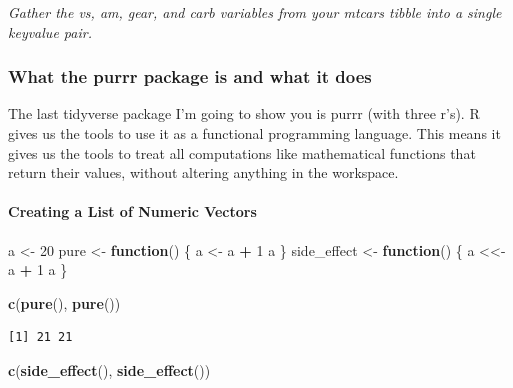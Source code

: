 \documentclass[
]{article}
\newenvironment{Shaded}{\begin{snugshade}}{\end{snugshade}}
\newcommand{\ControlFlowTok}[1]{\textcolor[rgb]{0.13,0.29,0.53}{\textbf{#1}}}
\newcommand{\DecValTok}[1]{\textcolor[rgb]{0.00,0.00,0.81}{#1}}
\newcommand{\FunctionTok}[1]{\textcolor[rgb]{0.13,0.29,0.53}{\textbf{#1}}}
\newcommand{\NormalTok}[1]{#1}
\newcommand{\OtherTok}[1]{\textcolor[rgb]{0.56,0.35,0.01}{#1}}
\newcommand{\SpecialCharTok}[1]{\textcolor[rgb]{0.81,0.36,0.00}{\textbf{#1}}}
\begin{document}
\emph{Gather the vs, am, gear, and carb variables from your mtcars
tibble into a single keyvalue pair.}

\subsubsection{What the purrr package is and what it
does}\label{what-the-purrr-package-is-and-what-it-does}

The last tidyverse package I'm going to show you is purrr (with three
r's). R gives us the tools to use it as a functional programming
language. This means it gives us the tools to treat all computations
like mathematical functions that return their values, without altering
anything in the workspace.

\paragraph{Creating a List of Numeric
Vectors}\label{creating-a-list-of-numeric-vectors}

\begin{Shaded}
\begin{Highlighting}[]
\NormalTok{a }\OtherTok{\textless{}{-}} \DecValTok{20}
\NormalTok{pure }\OtherTok{\textless{}{-}} \ControlFlowTok{function}\NormalTok{() \{}
\NormalTok{  a }\OtherTok{\textless{}{-}}\NormalTok{ a }\SpecialCharTok{+} \DecValTok{1}
\NormalTok{a}
\NormalTok{\}}
\NormalTok{side\_effect }\OtherTok{\textless{}{-}} \ControlFlowTok{function}\NormalTok{() \{}
\NormalTok{  a }\OtherTok{\textless{}\textless{}{-}}\NormalTok{ a }\SpecialCharTok{+} \DecValTok{1}
\NormalTok{a}
\NormalTok{\}}
\end{Highlighting}
\end{Shaded}

\begin{Shaded}
\begin{Highlighting}[]
\FunctionTok{c}\NormalTok{(}\FunctionTok{pure}\NormalTok{(), }\FunctionTok{pure}\NormalTok{())}
\end{Highlighting}
\end{Shaded}

\begin{verbatim}
[1] 21 21
\end{verbatim}

\begin{Shaded}
\begin{Highlighting}[]
\FunctionTok{c}\NormalTok{(}\FunctionTok{side\_effect}\NormalTok{(), }\FunctionTok{side\_effect}\NormalTok{())}
\end{Highlighting}
\end{Shaded}
\end{document}
